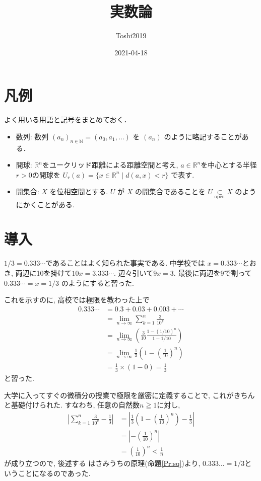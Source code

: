 \documentclass[11pt, a4paper, dvipdfmx]{jsarticle}
\title{実数論}
\author{Toshi2019}
\date{2021-04-18}
\theoremstyle{definition}
\newcommand{\N}{\mathbb{N}}
\newcommand{\R}{\mathbb{R}}
\numberwithin{equation}{section} %
\begin{document}
\maketitle

\begin{abstract}
\end{abstract}
\section{凡例}

よく用いる用語と記号をまとめておく．
\begin{itemize}
  \item 数列: 
  数列 $(a_n)_{n\in\N} = (a_0,a_1,\dots)$ を 
  $(a_n)$ のように略記することがある．
  \item 開球: 
  ${\R}^n$をユークリッド距離による距離空間と考え, 
  $a\in{\R}^n$を中心とする半径$r > 0$の開球を
  $U_r(a) = \{x\in{\R}^n\mid d(a,x)< r\}$
  で表す. 
  \item 開集合: 
  $X$ を位相空間とする. $U$ が $X$ の開集合であることを
  $U\underset{\text{open}}{\subset}X$ のようにかくことがある. 
\end{itemize}

\section{導入}

$1/3 = 0.333\cdots$であることはよく知られた事実である. 中学校では
$x = 0.333\cdots$とおき, 両辺に10を掛けて$10x = 3.333\cdots$. 
辺々引いて$9x = 3$. 最後に両辺を9で割って$0.333\cdots = x = 1/3$
のようにすると習った. 

これを示すのに, 高校では極限を教わった上で
\begin{align*}
  0.333\cdots 
  &= 0.3 + 0.03 + 0.003 + \cdots\\
  &= \lim_{n\to\infty}\sum_{k=1}^{n}\frac{3}{10^k}\\
  &= \lim_{n\to\infty}\left(\frac{3}{10}
  \frac{1-(1/10)^n}{1-1/10} \right)\\
  &= \lim_{n\to\infty}\frac{1}{3}
  \left(1-\left(\frac{1}{10}\right)^n\right)\\
  &= \frac{1}{3}\times(1-0) = \frac{1}{3}
\end{align*}
と習った. 

大学に入ってすぐの微積分の授業で極限を厳密に定義することで, 
これがきちんと基礎付けられた. すなわち, 任意の自然数$n\geqq1$に対し, 
\begin{align*}
  \left|\sum_{k=1}^{n}\frac{3}{10^k} - \frac{1}{3}\right| 
  &= \left|\frac{1}{3}
  \left(1-\left(\frac{1}{10}\right)^n\right)
  - \frac{1}{3}\right|\\
  &= \left|-\left(\frac{1}{10}\right)^n\right|\\
  &= \left(\frac{1}{10}\right)^n < \frac{1}{n}
\end{align*}
が成り立つので, 後述する
はさみうちの原理(命題\ref{Pr:sq})より, 
$0.333\dots=1/3$ということになるのであった. 
\end{document}
